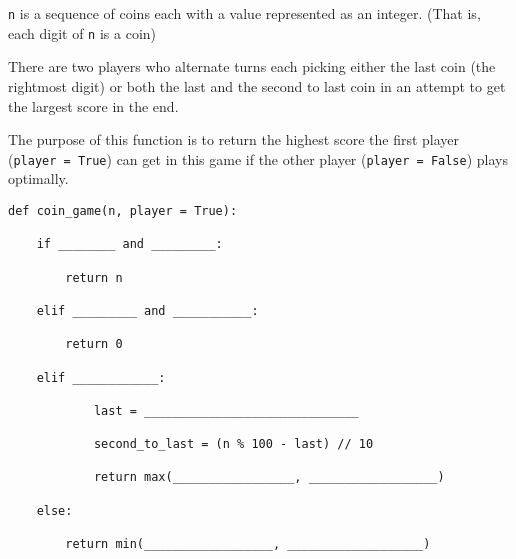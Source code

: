 \begin{blocksection}
\question \texttt{n} is a sequence of coins each with a value represented as an integer. (That is, each digit of \texttt{n} is a coin)

There are two players who alternate turns each picking either the last coin (the rightmost digit) or both the last and the second to last coin in an attempt to get the largest score in the end. 

The purpose of this function is to return the highest score the first player (\texttt{player = True}) can get in this game if the other player (\texttt{player = False}) plays optimally.


\begin{lstlisting}
def coin_game(n, player = True):

    if ________ and _________:
		
   	    return n
				
    elif _________ and ___________:
		
        return 0
				
    elif ____________:
				
            last = ______________________________
						
            second_to_last = (n % 100 - last) // 10
						
            return max(_________________, __________________)
						
    else:
		
        return min(__________________, ___________________)

\end{lstlisting}
\end{blocksection}
